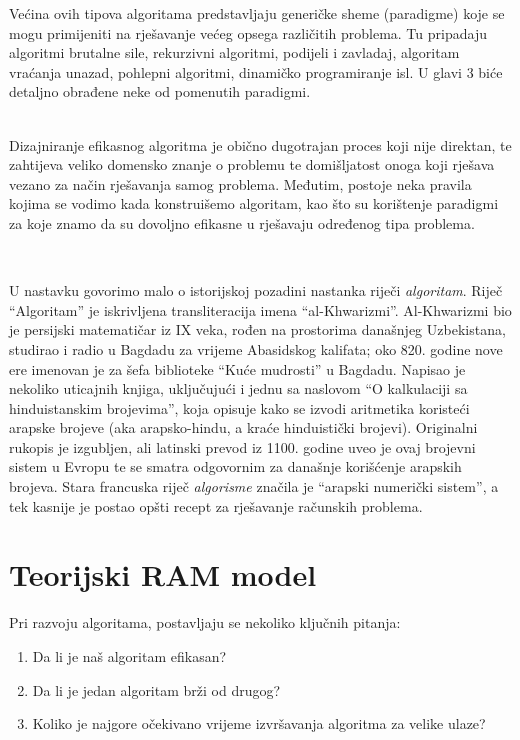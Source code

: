    Većina ovih tipova algoritama predstavljaju generičke sheme (paradigme) koje se mogu primijeniti na  rješavanje većeg opsega različitih problema. Tu pripadaju algoritmi brutalne sile, rekurzivni algoritmi, podijeli i zavladaj, algoritam vraćanja unazad, pohlepni algoritmi, dinamičko programiranje isl. U glavi 3 biće detaljno obrađene  neke od pomenutih paradigmi.
   
    \\
  
Dizajniranje efikasnog algoritma je obično dugotrajan proces koji nije direktan, te zahtijeva veliko domensko znanje o problemu te domišljatost onoga koji rješava vezano za način rješavanja samog  problema.  Međutim, postoje neka pravila kojima se vodimo kada konstruišemo algoritam, kao što su korištenje paradigmi za koje znamo da su dovoljno efikasne u rješavaju određenog tipa problema. 
 
 \\  \vspace{0.3cm}
 
 U nastavku govorimo malo o istorijskoj pozadini nastanka riječi \textit{algoritam}. Riječ “Algoritam” je iskrivljena transliteracija imena “al-Khwarizmi”. Al-Khwarizmi bio je persijski matematičar iz IX veka, rođen na prostorima današnjeg Uzbekistana, studirao i radio u Bagdadu za vrijeme Abasidskog kalifata; oko 820. godine nove ere imenovan je za
  šefa biblioteke ``Kuće mudrosti'' u Bagdadu. Napisao je nekoliko
 uticajnih knjiga, uključujući i jednu sa naslovom ``O kalkulaciji sa hinduistanskim brojevima'', koja opisuje kako se izvodi aritmetika koristeći arapske brojeve (aka arapsko-hindu, a kraće hinduistički brojevi). Originalni rukopis je izgubljen, ali latinski prevod iz 
 1100. godine uveo je ovaj brojevni sistem u Evropu te se smatra odgovornim  za današnje korišćenje  arapskih brojeva.   Stara francuska riječ \textit{algorisme} značila je
 ``arapski numerički sistem'', a tek kasnije je postao opšti recept za rješavanje računskih problema.

\section{Teorijski RAM model}

Pri razvoju algoritama, postavljaju se nekoliko ključnih pitanja: 
\begin{enumerate}
	\item Da li je naš algoritam efikasan? 
	\item Da li je jedan algoritam brži od drugog? 
	\item Koliko je najgore očekivano vrijeme izvršavanja algoritma za velike ulaze? 
\end{enumerate}
 

